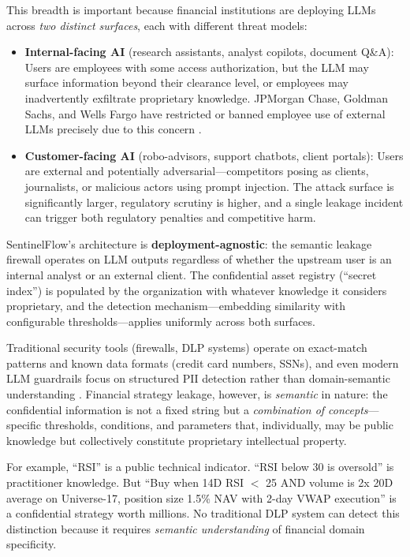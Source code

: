 \documentclass[12pt,a4paper]{article}
\begin{document}
This breadth is important because financial institutions are deploying LLMs across \textit{two distinct surfaces}, each with different threat models:

\begin{itemize}
\item \textbf{Internal-facing AI} (research assistants, analyst copilots, document Q\&A): Users are employees with some access authorization, but the LLM may surface information beyond their clearance level, or employees may inadvertently exfiltrate proprietary knowledge. JPMorgan Chase, Goldman Sachs, and Wells Fargo have restricted or banned employee use of external LLMs precisely due to this concern \cite{baytechconsulting_hallucinations}.
\item \textbf{Customer-facing AI} (robo-advisors, support chatbots, client portals): Users are external and potentially adversarial---competitors posing as clients, journalists, or malicious actors using prompt injection. The attack surface is significantly larger, regulatory scrutiny is higher, and a single leakage incident can trigger both regulatory penalties and competitive harm.
\end{itemize}

SentinelFlow's architecture is \textbf{deployment-agnostic}: the semantic leakage firewall operates on LLM outputs regardless of whether the upstream user is an internal analyst or an external client. The confidential asset registry (``secret index'') is populated by the organization with whatever knowledge it considers proprietary, and the detection mechanism---embedding similarity with configurable thresholds---applies uniformly across both surfaces.

Traditional security tools (firewalls, DLP systems) operate on exact-match patterns and known data formats (credit card numbers, SSNs), and even modern LLM guardrails focus on structured PII detection rather than domain-semantic understanding \cite{owasp_llm_2025}. Financial strategy leakage, however, is \textit{semantic} in nature: the confidential information is not a fixed string but a \textit{combination of concepts}---specific thresholds, conditions, and parameters that, individually, may be public knowledge but collectively constitute proprietary intellectual property.

For example, ``RSI'' is a public technical indicator. ``RSI below 30 is oversold'' is practitioner knowledge. But ``Buy when 14D RSI $<$ 25 AND volume is 2x 20D average on Universe-17, position size 1.5\% NAV with 2-day VWAP execution'' is a confidential strategy worth millions. No traditional DLP system can detect this distinction because it requires \textit{semantic understanding} of financial domain specificity.
\end{document}

